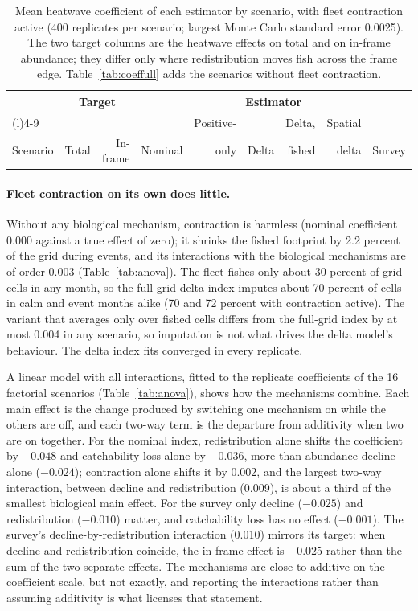 \documentclass[11pt,a4paper]{article}
\begin{document}
\begin{table}[tbp]
\centering\footnotesize
\setlength{\tabcolsep}{3.5pt}
\caption{Mean heatwave coefficient of each estimator by scenario, with fleet contraction active (400 replicates per scenario; largest Monte Carlo standard error 0.0025). The two target columns are the heatwave effects on total and on in-frame abundance; they differ only where redistribution moves fish across the frame edge. Table~\ref{tab:coeffull} adds the scenarios without fleet contraction.}
\label{tab:coef}
\begin{tabular}{@{}>{\raggedright\arraybackslash}p{3.2cm}rrrrrrrr@{}}
\toprule
 & \multicolumn{2}{c}{Target} & \multicolumn{6}{c}{Estimator} \\
\cmidrule(lr){2-3}\cmidrule(l){4-9}
 & & & & Positive- & & Delta, & Spatial & \\
Scenario & Total & In-frame & Nominal & only & Delta & fished & delta & Survey \\
\midrule
\bottomrule
\end{tabular}
\end{table}

\paragraph{Fleet contraction on its own does little.} Without any biological mechanism, contraction is harmless (nominal coefficient 0.000 against a true effect of zero); it shrinks the fished footprint by 2.2 percent of the grid during events, and its interactions with the biological mechanisms are of order 0.003 (Table~\ref{tab:anova}). The fleet fishes only about 30 percent of grid cells in any month, so the full-grid delta index imputes about 70 percent of cells in calm and event months alike (70 and 72 percent with contraction active). The variant that averages only over fished cells differs from the full-grid index by at most 0.004 in any scenario, so imputation is not what drives the delta model's behaviour. The delta index fits converged in every replicate.

A linear model with all interactions, fitted to the replicate coefficients of the 16 factorial scenarios (Table~\ref{tab:anova}), shows how the mechanisms combine. Each main effect is the change produced by switching one mechanism on while the others are off, and each two-way term is the departure from additivity when two are on together. For the nominal index, redistribution alone shifts the coefficient by $-0.048$ and catchability loss alone by $-0.036$, more than abundance decline alone ($-0.024$); contraction alone shifts it by 0.002, and the largest two-way interaction, between decline and redistribution (0.009), is about a third of the smallest biological main effect. For the survey only decline ($-0.025$) and redistribution ($-0.010$) matter, and catchability loss has no effect ($-0.001$). The survey's decline-by-redistribution interaction (0.010) mirrors its target: when decline and redistribution coincide, the in-frame effect is $-0.025$ rather than the sum of the two separate effects. The mechanisms are close to additive on the coefficient scale, but not exactly, and reporting the interactions rather than assuming additivity is what licenses that statement.
\end{document}
